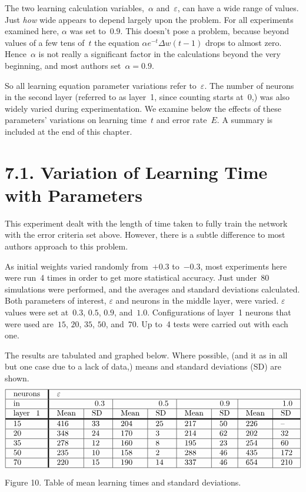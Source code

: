 \documentclass[12pt]{report}
\begin{document}
The two learning calculation variables,~$\alpha$ and~$\varepsilon$,
can have a wide range of values.
Just {\sl how} wide appears to depend largely upon the problem.
For all experiments examined here, $\alpha$ was set to~$0.9$.
This doesn't pose a problem, because beyond values of a few tens of~$t$ the 
equation $\alpha e^{-t} \Delta w(t-1)$ drops to almost zero.
Hence~$\alpha$ is not really a significant factor in the
calculations beyond the very beginning, and most authors set~$\alpha = 0.9$.

So all learning equation parameter variations refer
to~$\varepsilon$.
The number of neurons in the second layer (referred to as layer~1, since
counting starts at~0,) was also widely varied
during experimentation.
We examine below the effects of these parameters' variations 
on learning time~$t$ and error rate~$E$.
A summary is included at the end of this chapter.

\section{7.1. Variation of Learning Time with Parameters}

This experiment dealt with the length of time taken to fully train
the network with the error criteria set above.
However, there is a subtle difference to most authors approach to
this problem.

As initial weights varied randomly from~$+0.3$ to~$-0.3$, most experiments 
here were run~4 times in order to get more statistical accuracy.
Just under~80 simulations were performed, and the averages and standard
deviations calculated.
Both parameters of interest, $\varepsilon$ and neurons in the middle
layer, were varied.
$\varepsilon$ values were set at~$0.3$, $0.5$, $0.9$, and~$1.0$.
Configurations of layer~1 neurons that were used 
are~$15$, $20$, $35$, $50$, and~$70$.
Up to~4 tests were carried out with each one.

The results are tabulated and graphed below.
Where possible, (and it as in all but one case due to a lack of
data,) means and standard deviations (SD) are shown.
$$
\vbox{\tabskip=0pt \offinterlineskip

\halign{\strut#& \vrule#\tabskip=1em plus2em&
 #& \vrule width1.5pt#&
 #& \vrule#&
 #& \vrule#&
 #& \vrule#&
 #& \vrule#&
 #& \vrule#&
 #& \vrule#&
 #& \vrule#&
 #& \vrule#\tabskip=0pt\cr
\hline
&&{neurons}&&\multispan{15}$\varepsilon$&\cr
\hline
&&{in}&&\multispan3 0.3&&\multispan3 0.5&&
 \multispan3 0.9&&\multispan3 1.0&\cr
\hline
&&{layer 1}&&{Mean}&&{SD}
 &&{Mean}&&{SD}
 &&{Mean}&&{SD}&&{Mean}&&{SD}&\cr
\noalign{\hrule height1.5pt}
&&15&&416&&33&&204&&25&&217&&50&&226&&--&\cr
\hline
&&20&&348&&24&&170&&3&&214&&62&&202&&32&\cr
\hline
&&35&&278&&12&&160&&8&&195&&23&&254&&60&\cr
\hline
&&50&&235&&10&&158&&2&&288&&46&&435&&172&\cr
\hline
&&70&&220&&15&&190&&14&&337&&46&&654&&210&\cr
\hline
}}
$$
{Figure 10. Table of mean learning times and standard deviations.}
\end{document}
